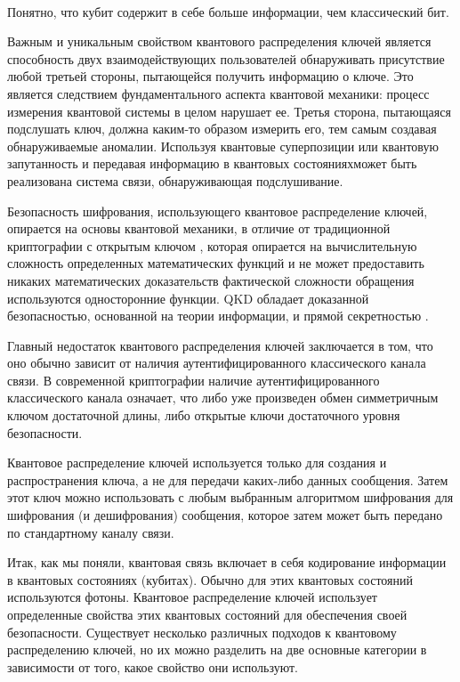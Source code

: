 \documentclass[a4paper,12pt]{article} %
\begin{document}
~\\

Понятно, что кубит содержит в себе больше информации, чем классический бит.

Важным и уникальным свойством квантового распределения ключей является способность двух взаимодействующих пользователей обнаруживать присутствие любой третьей стороны, пытающейся получить информацию о ключе. Это является следствием фундаментального аспекта квантовой механики: процесс измерения квантовой системы в целом нарушает ее. Третья сторона, пытающаяся подслушать ключ, должна каким-то образом измерить его, тем самым создавая обнаруживаемые аномалии. Используя квантовые суперпозиции или квантовую запутанность и передавая информацию в квантовых состоянияхможет быть реализована система связи, обнаруживающая подслушивание. 	

Безопасность шифрования, использующего квантовое распределение ключей, опирается на основы квантовой механики, в отличие от традиционной криптографии с открытым ключом , которая опирается на вычислительную сложность определенных математических функций и не может предоставить никаких математических доказательств фактической сложности обращения используются односторонние функции. QKD обладает доказанной безопасностью, основанной на теории информации, и прямой секретностью .

Главный недостаток квантового распределения ключей заключается в том, что оно обычно зависит от наличия аутентифицированного классического канала связи. В современной криптографии наличие аутентифицированного классического канала означает, что либо уже произведен обмен симметричным ключом достаточной длины, либо открытые ключи достаточного уровня безопасности. 

Квантовое распределение ключей используется только для создания и распространения ключа, а не для передачи каких-либо данных сообщения. Затем этот ключ можно использовать с любым выбранным алгоритмом шифрования для шифрования (и дешифрования) сообщения, которое затем может быть передано по стандартному каналу связи.

Итак, как мы поняли, квантовая связь включает в себя кодирование информации в квантовых состояниях (кубитах). Обычно для этих квантовых состояний используются фотоны. Квантовое распределение ключей использует определенные свойства этих квантовых состояний для обеспечения своей безопасности. Существует несколько различных подходов к квантовому распределению ключей, но их можно разделить на две основные категории в зависимости от того, какое свойство они используют.
\end{document}
